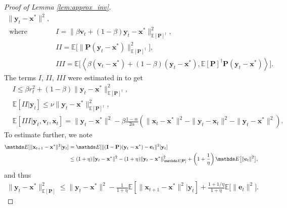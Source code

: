 \documentclass[11pt]{article}
\def\x{{\mathbf x}}
\def\e{{\mathbf e}}
\def\v{{\mathbf v}}
\def\y{{\mathbf y}}
\def\I{{\mathbf I}}
\def\P{{\mathbf P}}
\def\E{{\mathds E}}
\begin{document}
\begin{proof}[Proof of Lemma \ref{lem:approx_inv}]
\begin{align}
          \|\y_t-\x^*\|^2, \\
          \text{ where } \quad &I =  \|\beta\v_t + (1-\beta)\y_t - \x^*\|_{\E[\P]^\dagger}^2, \nonumber\\
          &II = \E \big[\|\P(\y_t-\x^*)\|_{\E[\P]^\dagger}^2 \big], \nonumber\\
          &III = \E \big[\left\langle \beta(\v_t - \x^*) + (1-\beta)(\y_t - \x^*), \E[\P]^\dagger\P(\y_t - \x^*)\right\rangle \big].\nonumber
      \end{align}
The terms $I$, $II$, $III$ were estimated in  \cite{gower2018accelerated} to get
      \begin{align}\label{eq:boundI}
          &I \leq \beta r_t^2 + (1-\beta)\|\y_t - \x^*\|_{\E[\P]^\dagger}^2,\nonumber\\
          &\E[II|\y_t] \leq \nu\|\y_t - \x^*\|_{\E[\P]^\dagger}^2, \\
          &\E[III | \y_t, \v_t, \x_t] = \|\y_t - \x^*\|^2 - \beta\frac{1-\alpha}{2\alpha}(\|\x_t - \x^*\|^2 - \|\y_t-\x_t\|^2 - \|\y_t-\x^*\|^2).\nonumber
      \end{align}
To estimate further, we note
\begin{align}
    \E[\|\x_{t+1} - \x^*\|^2 | \y_t] &= \E[\|(\I-\P)(\y_t - \x^*) - \e_t\|^2  | \y_t]\notag\\
    &\leq (1+\eta)\|\y_t - \x^*\|^2 - (1+\eta)\|\y_t - \x^*\|_{\E[\P]}^2 + \left(1+\frac{1}{\eta}\right) \E \big[\|\e_t\|^2 \big],\notag
\end{align}
      and thus
      \begin{align}\label{eq:newlem8}
          \|\y_t - \x^*\|_{\E[\P]}^2 \leq \|\y_t -\x^*\|^2 - \frac{1}{1+\eta} \E[\|\x_{t+1} - \x^*\|^2 | \y_t] + \frac{1+1/\eta}{1+\eta} \E \big[\|\e_t\|^2 \big].
      \end{align}


\end{proof}
\end{document}
